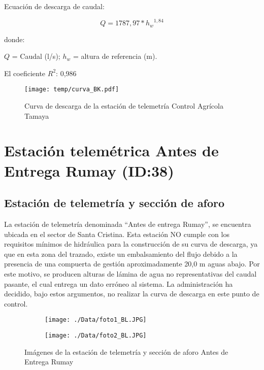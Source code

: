 \documentclass[]{article}
\begin{document}
Ecuación de descarga de caudal:

\[Q = 1787,97*{h_w}^{1,84}\]

donde:

\(Q\) = Caudal (l/s); \(h_w\) = altura de referencia (m).

El coeficiente \(R^2\): 0,986

\begin{figure}[H]
  \centering
  \texttt{[image: temp/curva\_BK.pdf]}
\caption{Curva de descarga de la estación de telemetría Control Agrícola Tamaya}
\label{fig:Curva_BK}
\end{figure}

\clearpage
\section{Estación telemétrica Antes de Entrega Rumay (ID:38)}

\subsection{Estación de telemetría y sección de aforo}

La estación de telemetría denominada ``Antes de entrega Rumay'', se encuentra ubicada en el sector de Santa Cristina. Esta estación NO cumple con los requisitos mínimos de hidráulica para la construcción de su curva de descarga, ya que en esta zona del trazado, existe un embalsamiento del flujo debido a la presencia de una compuerta de gestión aproximadamente 20,0 m aguas abajo. Por este motivo, se producen alturas de lámina de agua no representativas del caudal pasante, el cual entrega un dato erróneo al sistema. La administración ha decidido, bajo estos argumentos, no realizar la curva de descarga en este punto de control.

\begin{figure}[H]
  \centering
\begin{subfigure}{.49\textwidth}
  \texttt{[image: ./Data/foto1\_BL.JPG]}
\end{subfigure}
\hfill
\begin{subfigure}{.49\textwidth}
  \texttt{[image: ./Data/foto2\_BL.JPG]}
\end{subfigure}
\caption{Imágenes de la estación de telemetría y sección de aforo Antes de Entrega Rumay}
\label{fig:fotos_38}
\end{figure}
\end{document}
